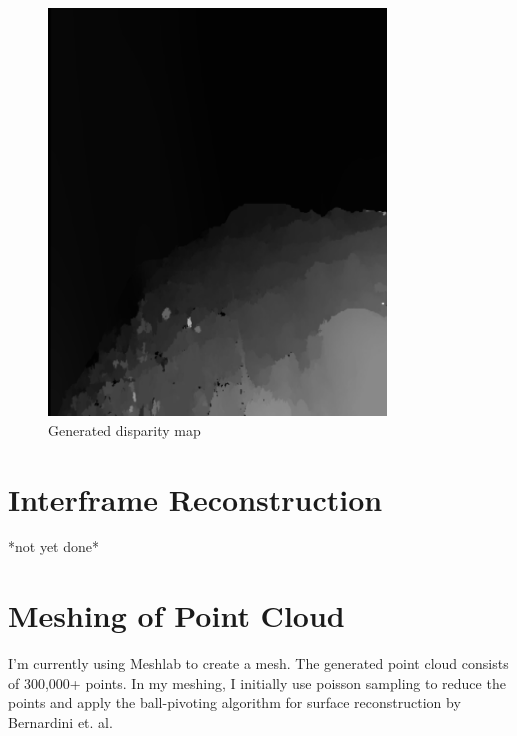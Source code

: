 \begin{figure}[H]
\includegraphics[width=0.8\textwidth, height=0.4\textwidth]{disp_map.eps}
\caption{Generated disparity map}
\end{figure}



\section{Interframe Reconstruction}
*not yet done*

\section{Meshing of Point Cloud}

I'm currently using Meshlab to create a mesh. The generated point cloud consists of 300,000+ points. In my meshing, I initially use poisson sampling to reduce the points and apply the ball-pivoting algorithm for surface reconstruction by Bernardini et. al.
    
